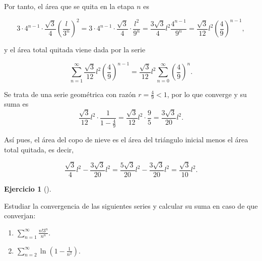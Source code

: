 \documentclass[
  spanish,
  a4paper,
]{scrreport}
\providecommand{\tightlist}{%
  \setlength{\itemsep}{0pt}\setlength{\parskip}{0pt}}
\theoremstyle{definition}
\newtheorem{exercise}{Ejercicio}[chapter]
\theoremstyle{remark}
\begin{document}
\begin{tcolorbox}
Por tanto, el área que se quita en la etapa \(n\) es

\[
3 \cdot 4^{n-1} \cdot \frac{\sqrt{3}}{4} \left(\frac{l}{3^n}\right)^2
= 3 \cdot 4^{n-1} \cdot \frac{\sqrt{3}}{4} \cdot \frac{l^2}{9^n}
= \frac{3\sqrt{3}}{4}l^2 \frac{4^{n-1}}{9^n}
= \frac{\sqrt{3}}{12}l^2 \left(\frac{4}{9}\right)^{n-1},
\]

y el área total quitada viene dada por la serie

\[
\sum_{n=1}^\infty \frac{\sqrt{3}}{12}l^2 \left(\frac{4}{9}\right)^{n-1}
= \frac{\sqrt{3}}{12}l^2 \sum_{n=0}^\infty  \left(\frac{4}{9}\right)^{n}.
\]

Se trata de una serie geométrica con razón \(r = \frac{4}{9}<1\), por lo
que converge y su suma es \[
\frac{\sqrt{3}}{12}l^2 \cdot \frac{1}{1-\frac{4}{9}}    
= \frac{\sqrt{3}}{12}l^2 \cdot \frac{9}{5}
= \frac{3\sqrt{3}}{20}l^2.
\]

Así pues, el área del copo de nieve es el área del triángulo inicial
menos el área total quitada, es decir,

\[
\frac{\sqrt{3}}{4}l^2 - \frac{3\sqrt{3}}{20}l^2
= \frac{5\sqrt{3}}{20}l^2 - \frac{3\sqrt{3}}{20}l^2
= \frac{\sqrt{3}}{10}l^2.
\]

\end{tcolorbox}

\begin{exercise}[]\protect\hypertarget{exr-5}{}\label{exr-5}

Estudiar la convergencia de las siguientes series y calcular su suma en
caso de que converjan:

\begin{enumerate}
\def\labelenumi{\alph{enumi}.}
\tightlist
\item
  \(\displaystyle\sum_{n=1}^\infty \frac{n!3^n}{n^n}\).
\item
  \(\displaystyle\sum_{n=2}^\infty \ln\left(1-\frac{1}{n^2}\right)\).
\end{enumerate}

\end{exercise}
\end{document}
